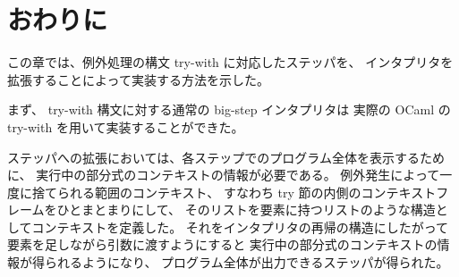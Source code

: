 \section{おわりに}
\label{section:try-with__conclusion}

この章では、例外処理の構文 try-with に対応したステッパを、
インタプリタを拡張することによって実装する方法を示した。

まず、 try-with 構文に対する通常の big-step インタプリタは
実際の OCaml の try-with を用いて実装することができた。

ステッパへの拡張においては、各ステップでのプログラム全体を表示するために、
実行中の部分式のコンテキストの情報が必要である。
例外発生によって一度に捨てられる範囲のコンテキスト、
すなわち try 節の内側のコンテキストフレームをひとまとまりにして、
そのリストを要素に持つリストのような構造としてコンテキストを定義した。
それをインタプリタの再帰の構造にしたがって要素を足しながら引数に渡すようにすると
実行中の部分式のコンテキストの情報が得られるようになり、
プログラム全体が出力できるステッパが得られた。
